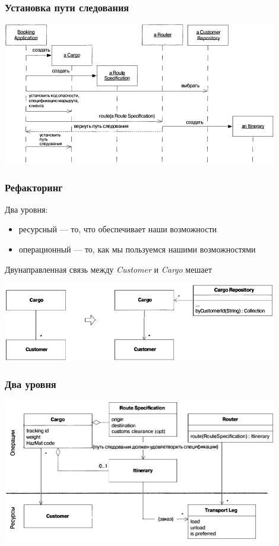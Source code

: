 \documentclass[xetex,mathserif,serif]{beamer}
\begin{document}
	\begin{frame}
		\frametitle{Установка пути следования}
		\begin{center}
			\includegraphics[width=0.9\textwidth]{cargoNonLayeredSequence.png}
		\end{center}
	\end{frame}

	\begin{frame}
		\frametitle{Рефакторинг}
		Два уровня:
		\begin{itemize} 
			\item ресурсный --- то, что обеспечивает наши возможности
			\item операционный --- то, как мы пользуемся нашими возможностями
		\end{itemize}
		Двунаправленная связь между \textit{Customer} и \textit{Cargo} мешает
		\begin{center}
			\includegraphics[width=0.9\textwidth]{cargoTwoLayersRefactoring.png}
		\end{center}
	\end{frame}

	\begin{frame}
		\frametitle{Два уровня}
		\begin{center}
			\includegraphics[width=0.9\textwidth]{cargoTwoLayers.png}
		\end{center}
	\end{frame}
\end{document}
